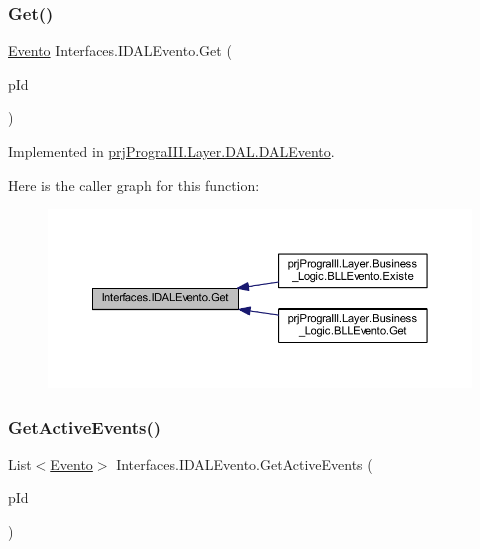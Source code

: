 \subsubsection{\texorpdfstring{Get()}{Get()}}
{\footnotesize\ttfamily \hyperlink{classprj_progra_i_i_i_1_1_layer_1_1_entities_1_1_evento}{Evento} Interfaces.\+I\+D\+A\+L\+Evento.\+Get (\begin{DoxyParamCaption}\item[{int}]{p\+Id }\end{DoxyParamCaption})}



Implemented in \hyperlink{classprj_progra_i_i_i_1_1_layer_1_1_d_a_l_1_1_d_a_l_evento_aaaa8b7f305fa6367d39bc53308d96aec}{prj\+Progra\+I\+I\+I.\+Layer.\+D\+A\+L.\+D\+A\+L\+Evento}.

Here is the caller graph for this function\+:
\nopagebreak
\begin{figure}[H]
\begin{center}
\leavevmode
\includegraphics[width=350pt]{interface_interfaces_1_1_i_d_a_l_evento_a2a6665c82b5721edc25723109e1add77_icgraph}
\end{center}
\end{figure}
\hypertarget{interface_interfaces_1_1_i_d_a_l_evento_ab7b63b6b4b49fea14ead7a91733ed973}{}\label{interface_interfaces_1_1_i_d_a_l_evento_ab7b63b6b4b49fea14ead7a91733ed973} 
\subsubsection{\texorpdfstring{Get\+Active\+Events()}{GetActiveEvents()}}
{\footnotesize\ttfamily List$<$\hyperlink{classprj_progra_i_i_i_1_1_layer_1_1_entities_1_1_evento}{Evento}$>$ Interfaces.\+I\+D\+A\+L\+Evento.\+Get\+Active\+Events (\begin{DoxyParamCaption}\item[{Date\+Time}]{p\+Id }\end{DoxyParamCaption})}



